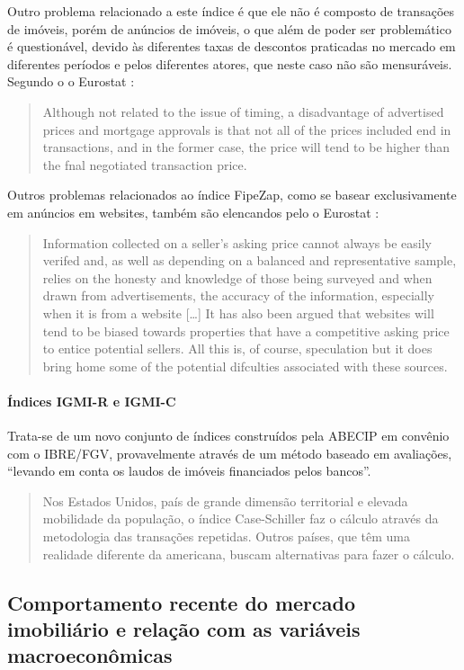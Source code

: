 \documentclass[
	12pt,				%
	oneside,			%
	a4paper,			%
	chapter=TITLE,		%
	section=TITLE,		%
	english,			%
	brazil				%
	]{abntex2}
\begin{document}
Outro problema relacionado a este índice é que ele não é composto de
transações de imóveis, porém de anúncios de imóveis, o que além de poder
ser problemático é questionável, devido às diferentes taxas de descontos
praticadas no mercado em diferentes períodos e pelos diferentes atores,
que neste caso não são mensuráveis. Segundo o o Eurostat
\autocite*[126]{rppi}:
\begin{quote}
Although not related to the issue of timing, a disadvantage of
advertised prices and mortgage approvals is that not all of the prices
included end in transactions, and in the former case, the price will
tend to be higher than the fnal negotiated transaction price.
\end{quote}
Outros problemas relacionados ao índice FipeZap, como se basear
exclusivamente em anúncios em websites, também são elencandos pelo o
Eurostat \autocite*[104]{rppi}:
\begin{quote}
Information collected on a seller's asking price cannot always be easily
verifed and, as well as depending on a balanced and representative
sample, relies on the honesty and knowledge of those being surveyed and
when drawn from advertisements, the accuracy of the information,
especially when it is from a website {[}\ldots{}{]} It has also been
argued that websites will tend to be biased towards properties that have
a competitive asking price to entice potential sellers. All this is, of
course, speculation but it does bring home some of the potential
difculties associated with these sources.
\end{quote}
\paragraph{Índices IGMI-R e IGMI-C}\label{uxedndices-igmi-r-e-igmi-c}

Trata-se de um novo conjunto de índices construídos pela \gls{ABECIP} em
convênio com o \gls{IBRE}/\gls{FGV}, provavelmente através de um método
baseado em avaliações, ``levando em conta os laudos de imóveis
financiados pelos bancos''.
\begin{quote}
Nos Estados Unidos, país de grande dimensão territorial e elevada
mobilidade da população, o índice Case-Schiller faz o cálculo através da
metodologia das transações repetidas. Outros países, que têm uma
realidade diferente da americana, buscam alternativas para fazer o
cálculo.
\end{quote}
\subsection{Comportamento recente do mercado imobiliário e relação com
as variáveis
macroeconômicas}\label{comportamento-recente-do-mercado-imobiliuxe1rio-e-relauxe7uxe3o-com-as-variuxe1veis-macroeconuxf4micas}
\end{document}
